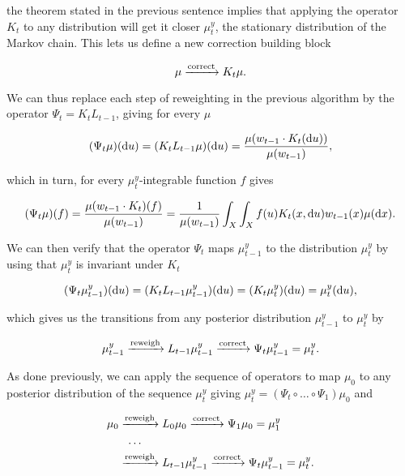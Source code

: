 the theorem stated in the previous sentence implies that applying the operator $K_t$ to any distribution will get it closer $\mu^y_t$, the stationary distribution of the Markov chain. This lets us define a new correction building block

\begin{equation*}
  \mu \xrightarrow{\text{correct}} K_t\mu.
\end{equation*}

We can thus replace each step of reweighting in the previous algorithm by the operator $\Psi_t = K_tL_{t-1}$, giving for every $\mu$

\begin{equation*}
  (\Psi_t \mu)(\text{d} u) = (K_tL_{t-1}\mu)(\text{d} u) = \frac{\mu(w_{t-1} \cdot K_t(\text{d} u))}{\mu(w_{t-1})},
\end{equation*}

which in turn, for every $\mu^y_t$-integrable function $f$ gives

\begin{equation*}
  (\Psi_t \mu)(f) = \frac{\mu(w_{t-1} \cdot K_t)(f)}{\mu(w_{t-1})} = \frac1{\mu(w_{t-1})}\int_X\int_Xf(u)K_t(x, \text{d} u)w_{t-1}(x)\mu(\text{d} x).
\end{equation*}

We can then verify that the operator $\Psi_t$ maps $\mu^y_{t-1}$ to the distribution $\mu^y_t$ by using that $\mu^y_t$ is invariant under $K_t$

\begin{equation*}
  (\Psi_t\mu^y_{t-1})(\text{d} u)
  = (K_tL_{t-1}\mu^y_{t-1})(\text{d} u)
  = (K_t\mu^y_t)(\text{d} u)
  = \mu^y_t(\text{d} u),
\end{equation*}

which gives us the transitions from any posterior distribution $\mu_{t-1}^y$ to $\mu^y_t$ by

\begin{equation*}
  \mu^y_{t-1} \xrightarrow{\text{reweigh}} L_{t-1}\mu^y_{t-1} \xrightarrow{\text{correct}} \Psi_t\mu^y_{t-1} = \mu^y_t.
\end{equation*}

As done previously, we can apply the sequence of operators to map $\mu_0$ to any posterior distribution of the sequence $\mu^y_t$ giving $\mu^y_t = (\Psi_t \circ \ldots \circ \Psi_1)\mu_0$ and

\begin{align*}
  \mu_0
  &\xrightarrow{\text{reweigh}} L_0\mu_0 \xrightarrow{\text{correct}} \Psi_1\mu_0 = \mu^y_1\\
  &\ \ \ldots\\
  &\xrightarrow{\text{reweigh}} L_{t-1}\mu^y_{t-1} \xrightarrow{\text{correct}} \Psi_t\mu^y_{t-1} = \mu^y_t.
\end{align*}

